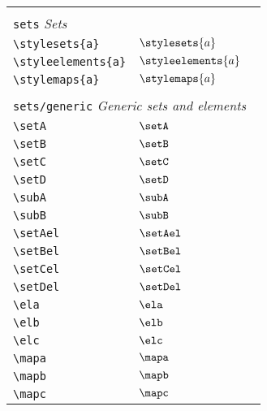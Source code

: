 \begin{longtable}{lll}
 &  & \\ 
 \multicolumn{3}{l}{{\color[rgb]{0.5,0.5,0.5}\texttt{sets}} \emph{Sets}}\\ 
 \hline
\hline
{\color[rgb]{0.5,0.5,0.5}\texttt{\textbackslash stylesets\{a\}}} & $\stylesets{a}$ & \\ 
 {\color[rgb]{0.5,0.5,0.5}\texttt{\textbackslash styleelements\{a\}}} & $\styleelements{a}$ & \\ 
 {\color[rgb]{0.5,0.5,0.5}\texttt{\textbackslash stylemaps\{a\}}} & $\stylemaps{a}$ & \\ 
  &  & \\ 
 \multicolumn{3}{l}{{\color[rgb]{0.5,0.5,0.5}\texttt{sets/generic}} \emph{Generic sets and elements}}\\ 
 \hline
{\color[rgb]{0.5,0.5,0.5}\texttt{\textbackslash setA}} & $\setA$ & \\ 
 {\color[rgb]{0.5,0.5,0.5}\texttt{\textbackslash setB}} & $\setB$ & \\ 
 {\color[rgb]{0.5,0.5,0.5}\texttt{\textbackslash setC}} & $\setC$ & \\ 
 {\color[rgb]{0.5,0.5,0.5}\texttt{\textbackslash setD}} & $\setD$ & \\ 
 {\color[rgb]{0.5,0.5,0.5}\texttt{\textbackslash subA}} & $\subA$ & \\ 
 {\color[rgb]{0.5,0.5,0.5}\texttt{\textbackslash subB}} & $\subB$ & \\ 
 {\color[rgb]{0.5,0.5,0.5}\texttt{\textbackslash setAel}} & $\setAel$ & \\ 
 {\color[rgb]{0.5,0.5,0.5}\texttt{\textbackslash setBel}} & $\setBel$ & \\ 
 {\color[rgb]{0.5,0.5,0.5}\texttt{\textbackslash setCel}} & $\setCel$ & \\ 
 {\color[rgb]{0.5,0.5,0.5}\texttt{\textbackslash setDel}} & $\setDel$ & \\ 
 {\color[rgb]{0.5,0.5,0.5}\texttt{\textbackslash ela}} & $\ela$ & \\ 
 {\color[rgb]{0.5,0.5,0.5}\texttt{\textbackslash elb}} & $\elb$ & \\ 
 {\color[rgb]{0.5,0.5,0.5}\texttt{\textbackslash elc}} & $\elc$ & \\ 
 {\color[rgb]{0.5,0.5,0.5}\texttt{\textbackslash mapa}} & $\mapa$ & \\ 
 {\color[rgb]{0.5,0.5,0.5}\texttt{\textbackslash mapb}} & $\mapb$ & \\ 
 {\color[rgb]{0.5,0.5,0.5}\texttt{\textbackslash mapc}} & $\mapc$ & \\ 

\end{longtable}
